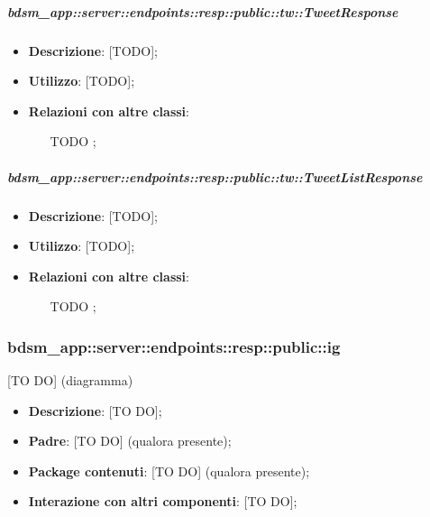     \subparagraph{bdsm\_app::server::endpoints::resp::public::tw::TweetResponse} %
    \label{subp:bdsm_app_server_endpoints_resp_public_tw_tweetresponse}
    \begin{itemize}
      \item \textbf{Descrizione}: [TODO];
      \item \textbf{Utilizzo}: [TODO];
      \item \textbf{Relazioni con altre classi}:
        \begin{itemize}
          \item [TODO];
        \end{itemize}
      \end{itemize}
    
    \subparagraph{bdsm\_app::server::endpoints::resp::public::tw::TweetListResponse} %
    \label{subp:bdsm_app_server_endpoints_resp_public_tw_tweetlistresponse}
    \begin{itemize}
      \item \textbf{Descrizione}: [TODO];
      \item \textbf{Utilizzo}: [TODO];
      \item \textbf{Relazioni con altre classi}:
        \begin{itemize}
          \item [TODO];
        \end{itemize}
      \end{itemize}

\subsubsection{bdsm\_app::server::endpoints::resp::public::ig} %
\label{ssub:bdsm_app_server_endpoints_resp_public_ig}
[TO DO] (diagramma) \newline \newline

\begin{itemize}
  \item \textbf{Descrizione}: [TO DO];
  \item \textbf{Padre}: [TO DO] (qualora presente);
  \item \textbf{Package contenuti}: [TO DO] (qualora presente);
  \item \textbf{Interazione con altri componenti}: [TO DO];
\end{itemize}

